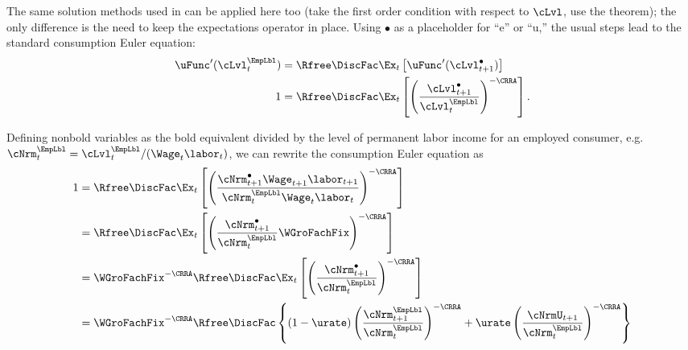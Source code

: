 \documentclass{econark}
\begin{document}
The same solution methods used in  can 
be applied here too (take the first order condition with respect to $\cLvl$, use
the  theorem); the only difference is the need to keep the expectations operator
in place.  Using $\bullet$ as a placeholder for ``e'' or ``u,'' the
usual steps lead to the standard consumption Euler equation:
\begin{equation}\begin{gathered}\begin{aligned}\label{eq:ctp1Oct}
        \uFunc^{\prime}(\cLvl^{\EmpLbl}_{t}) & =  \Rfree\DiscFac \Ex_{t}\left[\uFunc^{\prime}(\cLvl^{\bullet}_{t+1}) \right]
\\  1         & =  \Rfree\DiscFac \Ex_{t}\left[\left(\frac{\cLvl^{\bullet}_{t+1}}{\cLvl^{\EmpLbl}_{t}}\right)^{-\CRRA} \right]
.
\end{aligned}\end{gathered}\end{equation}

Defining nonbold variables as the bold equivalent divided by the level of permanent labor income for an employed consumer, e.g.\ ${\cNrm}^{\EmpLbl}_{t}=\cLvl^{\EmpLbl}_{t}/(\Wage_{t}\labor_{t})$, we can rewrite the consumption Euler equation as
\begin{equation}\label{eq:Explicit}\begin{split}
  1         & =  \Rfree\DiscFac \Ex_{t}\left[\left(\frac{{\cNrm}^{\bullet}_{t+1} \Wage_{t+1}\labor_{t+1}}{{\cNrm}^{\EmpLbl}_{t} \Wage_{t}\labor_{t}}\right)^{-\CRRA} \right]  
\\          & =  \Rfree\DiscFac \Ex_{t}\left[\left(\frac{{\cNrm}^{\bullet}_{t+1}}{{\cNrm}^{\EmpLbl}_{t}}\WGroFachFix\right)^{-\CRRA} \right]
\\          & =  \WGroFachFix^{-\CRRA}\Rfree\DiscFac \Ex_{t}\left[\left(\frac{{\cNrm}^{\bullet}_{t+1}}{{\cNrm}^{\EmpLbl}_{t}}\right)^{-\CRRA} \right] 
\\          & =  \WGroFachFix^{-\CRRA}\Rfree\DiscFac \left\{(1-\urate)\left(\frac{{\cNrm}^{\EmpLbl}_{t+1}}{{\cNrm}^{\EmpLbl}_{t}}\right)^{-\CRRA}+\urate \left(\frac{\cNrmU_{t+1}}{{\cNrm}^{\EmpLbl}_{t}}\right)^{-\CRRA}\right\} 
\end{split}\end{equation}
\end{document}
